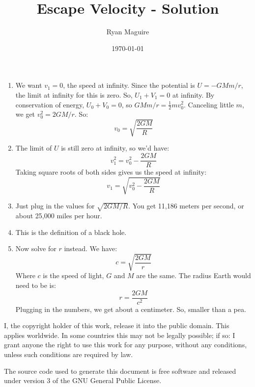 \documentclass{article}
\title{Escape Velocity - Solution}
\author{Ryan Maguire}
\date{\today}
\begin{document}
    \maketitle
    \begin{enumerate}
        \item
            We want $v_{1}=0$, the speed at infinity. Since the potential is
            $U=-GMm/r$, the limit at infinity for this is zero. So,
            $U_{1}+V_{1}=0$ at infinity. By conservation of energy,
            $U_{0}+V_{0}=0$, so $GMm/r=\frac{1}{2}mv_{0}^{2}$.
            Canceling little $m$, we get $v_{0}^{2}=2GM/r$. So:
            \begin{equation}
              v_{0}=\sqrt{\frac{2GM}{R}}
            \end{equation}
        \item
            The limit of $U$ is still zero at infinity, so we'd have:
            \begin{equation}
                v_{1}^{2}=v_{0}^{2}-\frac{2GM}{R}
            \end{equation}
            Taking square roots of both sides gives us the speed at
            infinity:
            \begin{equation}
                v_{1}=\sqrt{v_{0}^{2}-\frac{2GM}{R}}
            \end{equation}
        \item
            Just plug in the values for $\sqrt{2GM/R}$. You get
            11,186 meters per second, or about 25,000 miles per hour.
        \item
            This is the definition of a black hole.
        \item
            Now solve for $r$ instead. We have:
            \begin{equation}
                c=\sqrt{\frac{2GM}{r}}
            \end{equation}
            Where $c$ is the speed of light, $G$ and $M$ are the same. The
            radius Earth would need to be is:
            \begin{equation}
                r=\frac{2GM}{c^{2}}
            \end{equation}
            Plugging in the numbers, we get about a centimeter. So, smaller
            than a pea.
    \end{enumerate}
    \newpage
    I, the copyright holder of this work, release it into the public domain.
    This applies worldwide. In some countries this may not be legally possible;
    if so: I grant anyone the right to use this work for any purpose, without
    any conditions, unless such conditions are required by law.
    \par\hfill\par
    The source code used to generate this document is free software and released
    under version 3 of the GNU General Public License.
\end{document}
